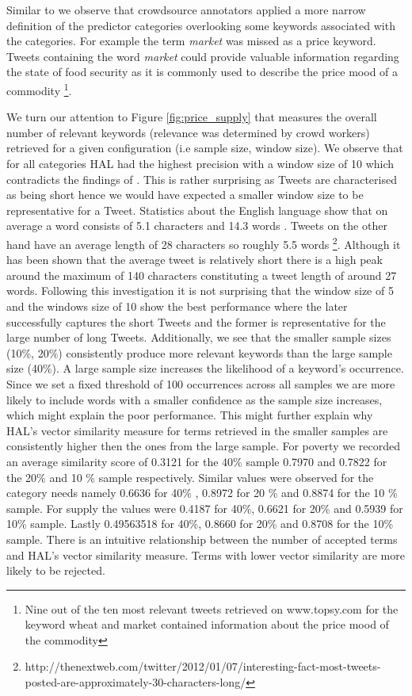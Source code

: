 Similar to \cite{olt15} we observe that crowdsource annotators applied a more narrow definition of the predictor categories overlooking some keywords associated with the categories. For example the term \emph{market} was missed as a price keyword. Tweets containing the word \emph{market} could provide valuable information regarding the state of food security as it is commonly used to describe the price mood of a commodity \footnote{Nine out of the ten most relevant tweets retrieved on www.topsy.com for the keyword wheat and market contained information about the price mood of the commodity}. 

We turn our attention to  Figure \ref{fig:price_supply} that measures the overall number of relevant keywords (relevance was determined by crowd workers) retrieved for a given configuration (i.e sample size, window size). We observe that for all categories HAL had the highest precision with a window size of 10 which contradicts the findings of \cite{lund96}. This is rather surprising as Tweets are characterised as being short hence we would have expected a smaller window size to be representative for a Tweet. Statistics about the English language show that on average a word consists of 5.1 characters and 14.3 words \cite{benson2013language}. Tweets on the other hand have an average length of 28 characters so roughly 5.5 words \footnote{http://thenextweb.com/twitter/2012/01/07/interesting-fact-most-tweets-posted-are-approximately-30-characters-long/}. Although it has been shown that the average tweet is relatively short there is a high peak around the maximum of 140 characters constituting a tweet length of around 27 words. Following this investigation it is not surprising that the window size of 5 and the windows size of 10 show the best performance where the later successfully captures the short Tweets and the former is representative for the large number of long Tweets.  Additionally, we see that the smaller sample sizes (10\%, 20\%) consistently produce more relevant keywords than the large sample size (40\%). A large sample size increases the likelihood of a keyword's occurrence. Since we set a fixed threshold of 100 occurrences across all samples we are more likely to include words with a smaller confidence as the sample size increases, which might explain the poor performance. This might further explain why HAL's vector similarity measure for terms retrieved in the smaller samples are consistently higher then the ones from the large sample. For poverty we recorded an average similarity score of 0.3121 for the 40\% sample  0.7970 and 0.7822 for the 20\% and 10 \% sample respectively. Similar values were observed for the category needs namely 0.6636 for 40\% , 0.8972 for 20 \% and 0.8874 for the 10 \% sample. For supply the values were 0.4187 for 40\%, 0.6621 for 20\% and 0.5939 for 10\% sample. Lastly 0.49563518 for 40\%,  0.8660 for 20\% and  0.8708 for the 10\% sample. There is an intuitive relationship between the number of accepted terms and HAL's vector similarity measure. Terms with lower vector similarity are more likely to be rejected. 


